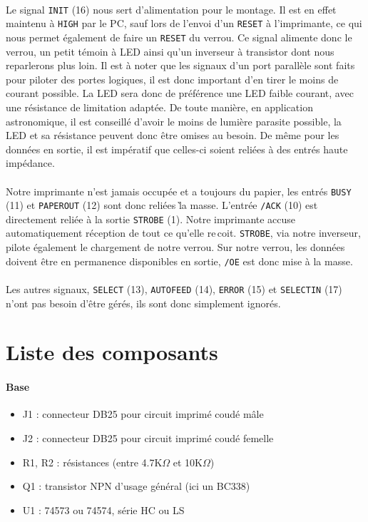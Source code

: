 \documentclass[11pt,a4paper]{book}
\begin{document}
\paragraph*{}
Le signal {\tt INIT} (16) nous sert d'alimentation pour le montage. Il est en effet maintenu \`a
{\tt HIGH} par le PC, sauf lors de l'envoi d'un {\tt RESET} \`a l'imprimante, ce qui nous permet 
\'egalement de faire un {\tt RESET} du verrou. Ce signal alimente donc le verrou, un petit t\'emoin
\`a LED ainsi qu'un inverseur \`a transistor dont nous reparlerons plus loin. Il est \`a noter
que les signaux d'un port parall\`ele sont faits pour piloter des portes logiques, il est donc 
important d'en tirer le moins de courant possible. La LED sera donc de pr\'ef\'erence une LED
faible courant, avec une r\'esistance de limitation adapt\'ee. De toute mani\`ere, en application
astronomique, il est conseill\'e d'avoir le moins de lumi\`ere parasite possible, la LED et sa r\'esistance 
peuvent donc \^etre omises au besoin. De m\^eme pour les donn\'ees en sortie, il est imp\'eratif que 
celles-ci soient reli\'ees \`a des entr\'es haute imp\'edance.

\paragraph*{}
 Notre imprimante n'est jamais occup\'ee et a toujours du papier, les entr\'es {\tt BUSY} (11) et
 {\tt PAPEROUT} (12) sont donc reli\'ees \` la masse. L'entr\'ee {\tt /ACK} (10) est directement reli\'ee
 \`a la sortie {\tt STROBE} (1). Notre imprimante accuse automatiquement r\'eception de tout ce
 qu'elle re\,coit. {\tt STROBE}, via notre inverseur, pilote \'egalement le chargement de notre
 verrou. Sur notre verrou, les donn\'ees doivent \^etre en permanence disponibles en sortie,
 {\tt /OE} est donc mise \`a la masse.
 
 \paragraph*{}
 Les autres signaux, {\tt SELECT} (13), {\tt AUTOFEED} (14), {\tt ERROR} (15) et 
 {\tt SELECTIN} (17) n'ont pas besoin d'\^etre g\'er\'es, ils sont donc simplement ignor\'es. 
 
\section*{Liste des composants}

\paragraph*{Base}
\begin{itemize}
\item J1 : connecteur DB25 pour circuit imprim\'e coud\'e m\^ale
\item J2 : connecteur DB25 pour circuit imprim\'e coud\'e femelle
\item R1, R2 : r\'esistances (entre 4.7K$\Omega$ et 10K$\Omega$)
\item Q1 : transistor NPN d'usage g\'en\'eral (ici un BC338)
\item U1 : 74573 ou 74574, s\'erie HC ou LS
\end{itemize} 
\end{document}
